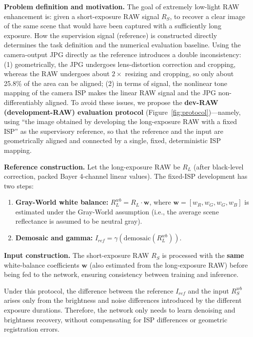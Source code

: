 \documentclass[remotesensing,article,accept,moreauthors]{Definitions/mdpi}
\begin{document}
\textbf{Problem definition and motivation.} The goal of extremely low-light RAW enhancement is: given a short-exposure RAW signal $R_S$, to recover a clear image of the same scene that would have been captured with a sufficiently long exposure. How the supervision signal (reference) is constructed directly determines the task definition and the numerical evaluation baseline. Using the camera-output JPG directly as the reference introduces a double inconsistency: (1) geometrically, the JPG undergoes lens-distortion correction and cropping, whereas the RAW undergoes about $2\times$ resizing and cropping, so only about 25.8\% of the area can be aligned; (2) in terms of signal, the nonlinear tone mapping of the camera ISP makes the linear RAW signal and the JPG non-differentiably aligned. To avoid these issues, we propose the \textbf{dev-RAW (development-RAW) evaluation protocol} (Figure~\ref{fig:protocol})---namely, using ``the image obtained by developing the long-exposure RAW with a fixed ISP'' as the supervisory reference, so that the reference and the input are geometrically aligned and connected by a single, fixed, deterministic ISP mapping.

\textbf{Reference construction.} Let the long-exposure RAW be $R_L$ (after black-level correction, packed Bayer 4-channel linear values). The fixed-ISP development has two steps:
\begin{enumerate}
\item \textbf{Gray-World white balance:} $R_L^{wb} = R_L \cdot \mathbf{w}$, where $\mathbf{w}=[w_R, w_G, w_G, w_B]$ is estimated under the Gray-World assumption (i.e., the average scene reflectance is assumed to be neutral gray).
\item \textbf{Demosaic and gamma:} $I_{ref} = \gamma(\mathrm{demosaic}(R_L^{wb}))$.
\end{enumerate}

\textbf{Input construction.} The short-exposure RAW $R_S$ is processed with the \textbf{same} white-balance coefficients $\mathbf{w}$ (also estimated from the long-exposure RAW) before being fed to the network, ensuring consistency between training and inference.

Under this protocol, the difference between the reference $I_{ref}$ and the input $R_S^{wb}$ arises only from the brightness and noise differences introduced by the different exposure durations. Therefore, the network only needs to learn denoising and brightness recovery, without compensating for ISP differences or geometric registration errors.
\end{document}
